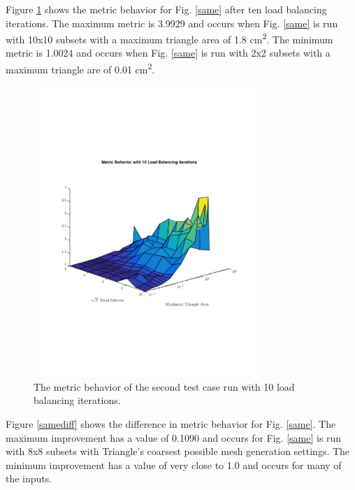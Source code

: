 \documentclass{anstrans}
\begin{document}
Figure \ref{sameiter} shows the metric behavior for Fig. \ref{same} after ten load balancing iterations. The maximum metric is 3.9929 and occurs when Fig. \ref{same} is run with 10x10 subsets with a maximum triangle area of 1.8 cm\textsuperscript{2}. The minimum metric is 1.0024 and occurs when Fig. \ref{same} is run with 2x2 subsets with a maximum triangle are of 0.01 cm\textsuperscript{2}.

\begin{figure}
\centering
\includegraphics[width=85mm, trim = 2cm 5cm 0cm 5cm,clip]{figures/SameIter.pdf}
\caption{The metric behavior of the second test case run with 10 load balancing iterations.}
\label{sameiter}
\end{figure}

Figure \ref{samediff} shows the difference in metric behavior for Fig. \ref{same}. The maximum improvement has a value of 0.1090 and occurs for Fig. \ref{same} is run with 8x8 subsets with Triangle's coarsest possible mesh generation settings. The minimum improvement has a value of very close to 1.0 and occurs for many of the inputs. 
\end{document}

